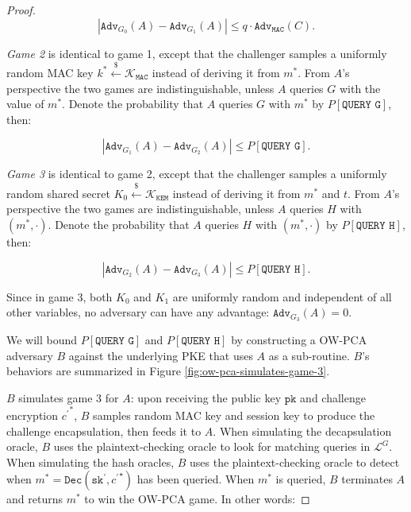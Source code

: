 \documentclass[runningheads]{llncs}
\newcommand{\decrypt}{\texttt{Dec}}
\newcommand{\kem}{\texttt{KEM}}
\newcommand{\mac}{\texttt{MAC}}
\newcommand{\pk}{\texttt{pk}}
\newcommand{\sk}{\texttt{sk}}
\newcommand{\leftsample}{\stackrel{\$}{\leftarrow}}
\newcommand{\adv}{\texttt{Adv}}
\begin{document}
\begin{proof}
    \begin{equation*}
        \left\vert \adv_{G_0}(A) - \adv_{G_1}(A) \right\vert\leq q\cdot  \adv_\texttt{MAC}(C).
    \end{equation*}

    \emph{Game 2} is identical to game 1, except that the challenger samples a uniformly random MAC key $k^\ast \leftsample \mathcal{K}_\mac$ instead of deriving it from $m^\ast$. From $A$'s perspective the two games are indistinguishable, unless $A$ queries $G$ with the value of $m^\ast$. Denote the probability that $A$ queries $G$ with $m^\ast$ by $P[\texttt{QUERY G}]$, then:

    \begin{equation*}
        \left\vert \adv_{G_1}(A) - \adv_{G_2}(A) \right\vert \leq P\left[\texttt{QUERY G}\right].
    \end{equation*}

    \emph{Game 3} is identical to game 2, except that the challenger samples a uniformly random shared secret $K_0 \leftsample \mathcal{K}_\kem$ instead of deriving it from $m^\ast$ and $t$. From $A$'s perspective the two games are indistinguishable, unless $A$ queries $H$ with $(m^\ast, \cdot)$. Denote the probability that $A$ queries $H$ with $(m^\ast, \cdot)$ by $P[\texttt{QUERY H}]$, then:

    \begin{equation*}
        \left\vert \adv_{G_2}(A) - \adv_{G_3}(A) \right\vert \leq P\left[\texttt{QUERY H}\right].
    \end{equation*}

    Since in game 3, both $K_0$ and $K_1$ are uniformly random and independent of all other variables, no adversary can have any advantage: $\adv_{G_3}(A) = 0$.

    We will bound $P[\texttt{QUERY G}]$ and $P[\texttt{QUERY H}]$ by constructing a OW-PCA adversary $B$ against the underlying PKE that uses $A$ as a sub-routine. $B$'s behaviors are summarized in Figure \ref{fig:ow-pca-simulates-game-3}.

    $B$ simulates game 3 for $A$: upon receiving the public key $\pk$ and challenge encryption ${c^\prime}^\ast$, $B$ samples random MAC key and session key to produce the challenge encapsulation, then feeds it to $A$. When simulating the decapsulation oracle, $B$ uses the plaintext-checking oracle to look for matching queries in $\mathcal{L}^G$. When simulating the hash oracles, $B$ uses the plaintext-checking oracle to detect when $m^\ast = \decrypt(\sk^\prime, {c^\prime}^\star)$ has been queried. When $m^\ast$ is queried, $B$ terminates $A$ and returns $m^\ast$ to win the OW-PCA game. In other words:


\end{proof}
\end{document}
